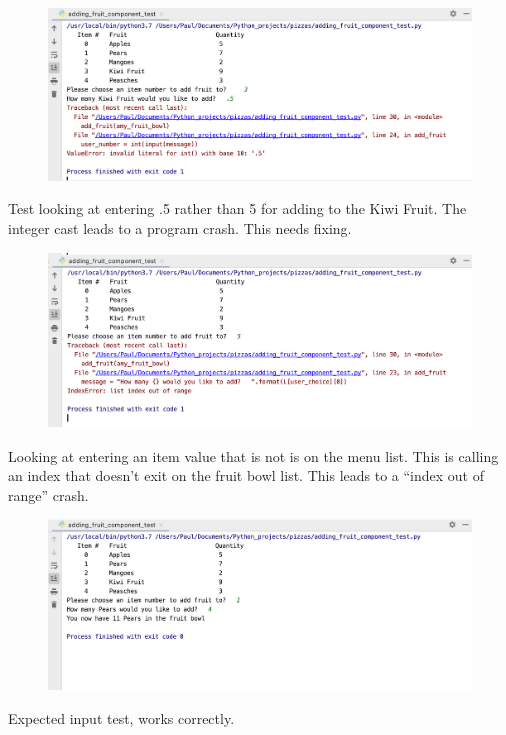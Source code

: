 \documentclass[a4paper,12pt]{article}
\begin{document}
\begin{figure}[!ht]
	\centering
	\includegraphics[width=14cm]{images/adding_fruit_test_1.png}
\end{figure}
Test looking at entering .5 rather than 5 for adding to the Kiwi Fruit. The integer cast leads to a program crash. This needs fixing.\\

\begin{figure}[!ht]
	\centering
	\includegraphics[width=14cm]{images/adding_fruit_test_2.png}
\end{figure}
Looking at entering an item value that is not is on the menu list. This is calling an index that doesn't exit on the fruit bowl list. This leads to a ``index out of range'' crash.\\

\begin{figure}[!ht]
	\centering
	\includegraphics[width=14cm]{images/adding_fruit_test_3.png}
\end{figure}
Expected input test, works correctly.\\
\end{document}
